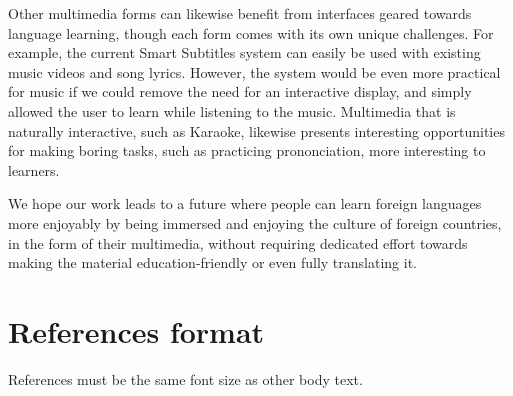 \documentclass{sigchi}
\begin{document}
Other multimedia forms can likewise benefit from interfaces geared
towards language learning, though each form comes with its own
unique challenges. For example, the current Smart Subtitles system can
easily be used with existing music videos and song lyrics.
However, the system would be even more practical for music if
we could remove the need for an interactive display, and simply
allowed the user to learn while listening to the music.
Multimedia that is naturally interactive, such as Karaoke,
likewise presents interesting opportunities for
making boring tasks, such as practicing prononciation, more interesting
to learners.

We hope our work leads to a future where people can learn foreign languages more enjoyably by being immersed and enjoying the culture of foreign countries, in the form of their multimedia, without requiring dedicated effort towards making the material education-friendly or even fully translating it.

\balance

\section{References format}
References must be the same font size as other body text.



\end{document}
